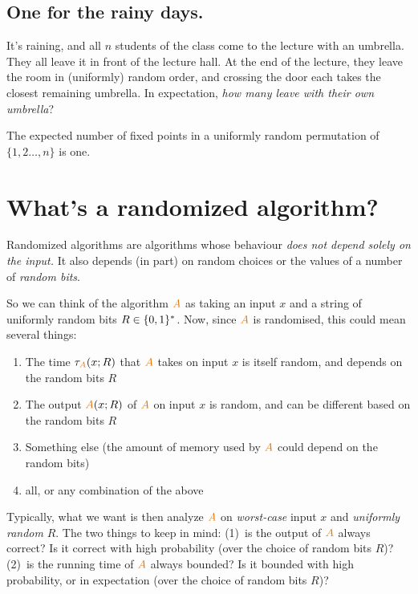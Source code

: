 \subsection{One for the rainy days.} It's raining, and all $n$ students of the class come to the lecture with an umbrella. They all leave it in front of the lecture hall. At the end of the lecture, they leave the room in (uniformly) random order, and crossing the door each takes the closest remaining umbrella. In expectation, \emph{how many leave with their own umbrella}?

\begin{theorem}
    The expected number of fixed points in a uniformly random permutation of $\{1,2\dots,n\}$ is one.
\end{theorem}

\section{What's a randomized algorithm?}
Randomized algorithms are algorithms whose behaviour \emph{does not
depend solely on the input.} It also depends (in part) on random
choices or the values of a number of \emph{random bits}.\smallskip

So we can think of the algorithm $\Algo$ as taking an input $x$ and a string of uniformly random bits $R\in\{0,1\}^\ast$. Now, since $\Algo$ is randomised, this could mean several things:
\begin{enumerate}
    \item The time $\tau_{\Algo}(x; R)$ that $\Algo$ takes on input $x$ is itself random, and depends on the random bits $R$
    \item The output $\Algo(x;R)$ of $\Algo$ on input $x$ is random, and can be different based on the random bits $R$
    \item Something else (\eg the amount of memory used by $\Algo$ could depend on the random bits)
    \item all, or any combination of the above
\end{enumerate}

Typically, what we want is then analyze $\Algo$ on \emph{worst-case} input $x$ and \emph{uniformly random} $R$. The two things to keep in mind: (1)~is the output of $\Algo$ always correct? Is it correct with high probability (over the choice of random bits $R$)? (2)~is the running time of $\Algo$ always bounded? Is it bounded with high probability, or in expectation (over the choice of random bits $R$)?

